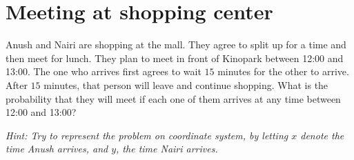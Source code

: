 \section{Meeting at shopping center}
\begin{problem} %
Anush and Nairi are shopping at the mall. They agree to split up for a time and then meet for lunch. They plan to meet in
front of Kinopark between 12:00 and 13:00. The one who arrives first agrees to wait $15$ minutes for the other to arrive. After $15$
minutes, that person will leave and continue shopping. What is the probability that they will meet if each one of them arrives at any time between 12:00 and 13:00?

\textit{Hint: Try to represent the problem on coordinate system, by letting
$x$ denote the time Anush arrives, and $y$, the time Nairi arrives.}
\end{problem}
\bigskip
